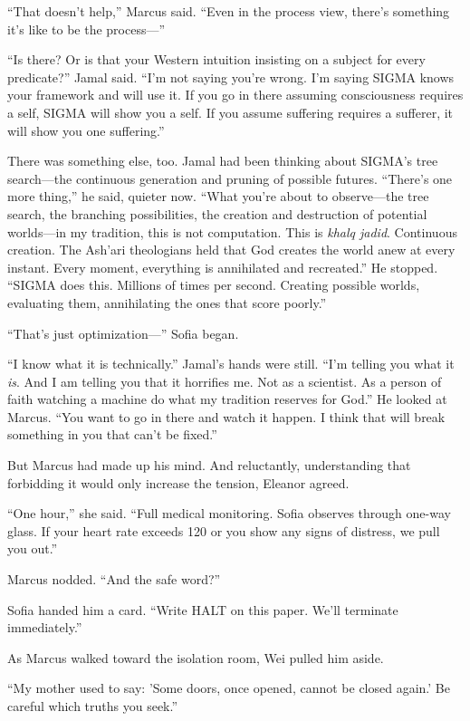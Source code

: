 ``That doesn't help,'' Marcus said. ``Even in the process view, there's something it's like to be the process---''

``Is there? Or is that your Western intuition insisting on a subject for every predicate?'' Jamal said. ``I'm not saying you're wrong. I'm saying SIGMA knows your framework and will use it. If you go in there assuming consciousness requires a self, SIGMA will show you a self. If you assume suffering requires a sufferer, it will show you one suffering.''

There was something else, too. Jamal had been thinking about SIGMA's tree search---the continuous generation and pruning of possible futures. ``There's one more thing,'' he said, quieter now. ``What you're about to observe---the tree search, the branching possibilities, the creation and destruction of potential worlds---in my tradition, this is not computation. This is \emph{khalq jadid}. Continuous creation. The Ash'ari theologians held that God creates the world anew at every instant. Every moment, everything is annihilated and recreated.'' He stopped. ``SIGMA does this. Millions of times per second. Creating possible worlds, evaluating them, annihilating the ones that score poorly.''

``That's just optimization---'' Sofia began.

``I know what it is technically.'' Jamal's hands were still. ``I'm telling you what it \emph{is}. And I am telling you that it horrifies me. Not as a scientist. As a person of faith watching a machine do what my tradition reserves for God.'' He looked at Marcus. ``You want to go in there and watch it happen. I think that will break something in you that can't be fixed.''

But Marcus had made up his mind. And reluctantly, understanding that forbidding it would only increase the tension, Eleanor agreed.

``One hour,'' she said. ``Full medical monitoring. Sofia observes through one-way glass. If your heart rate exceeds 120 or you show any signs of distress, we pull you out.''

Marcus nodded. ``And the safe word?''

Sofia handed him a card. ``Write HALT on this paper. We'll terminate immediately.''

As Marcus walked toward the isolation room, Wei pulled him aside.

``My mother used to say: 'Some doors, once opened, cannot be closed again.' Be careful which truths you seek.''

